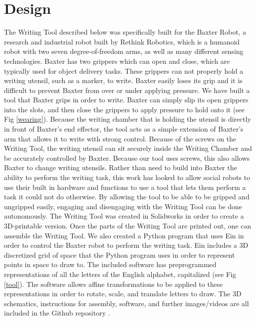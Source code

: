 \documentclass[letterpaper]{article}
\begin{document}
\section{Design}
The Writing Tool described below was specifically built for the Baxter Robot, a research and industrial robot built by Rethink Robotics, which is a humanoid robot with two seven degree-of-freedom arms, as well as many different sensing technologies. Baxter has two grippers which can open and close, which are typically used for object delivery tasks. These grippers can not properly hold a writing utensil, such as a marker, to write. Baxter easily loses its grip and it is difficult to prevent Baxter from over or under applying pressure. We have built a tool that Baxter grips in order to write. Baxter can simply slip its open grippers into the slots, and then close the grippers to apply pressure to hold onto it (see Fig \ref{wearing}). Because the writing chamber that is holding the utensil is directly in front of Baxter's end effector, the tool acts as a simple extension of Baxter's arm that allows it to write with strong control. Because of the screws on the Writing Tool, the writing utensil can sit securely inside the Writing Chamber and be accurately controlled by Baxter. Because our tool uses screws, this also allows Baxter to change writing utensils. Rather than need to build into Baxter the ability to perform the writing task, this work has looked to allow social robots to use their built in hardware and functions to use a tool that lets them perform a task it could not do otherwise. By allowing the tool to be able to be gripped and ungripped easily, engaging and disengaging with the Writing Tool can be done autonomously. The Writing Tool was created in Solidworks in order to create a 3D-printable version. Once the parts of the Writing Tool are printed out, one can assemble the Writing Tool. We also created a Python program that uses Ein in order to control the Baxter robot to perform the writing task. Ein includes a 3D discretized grid of space that the Python program uses in order to represent points in space to draw to. The included software has preprogrammed representations of all the letters of the English alphabet, capitalized (see Fig \ref{tool}). The software allows affine transformations to be applied to these representations in order to rotate, scale, and translate letters to draw. The 3D schematics, instructions for assembly, software, and further images/videos are all included in the Github repository \cite{github}.
\end{document}

